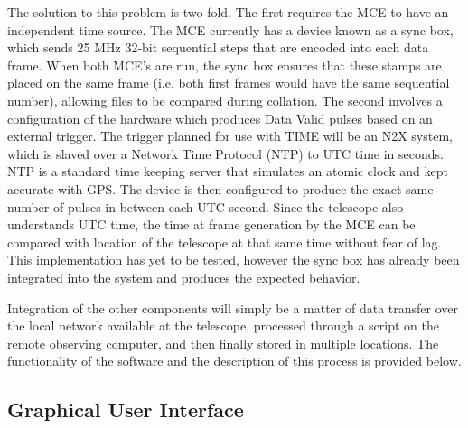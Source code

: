 \documentclass[manuscript]{aastex}
\begin{document}
The solution to this problem is two-fold. The first requires the MCE to have an independent time source. The MCE currently has a device known as a sync box, which sends 25 MHz 32-bit sequential steps that are encoded into each data frame. When both MCE's are run, the sync box ensures that these stamps are placed on the same frame (i.e. both first frames would have the same sequential number), allowing files to be compared during collation. The second involves a configuration of the hardware which produces Data Valid pulses based on an external trigger. The trigger planned for use with TIME will be an N2X system, which is slaved over a Network Time Protocol (NTP) to UTC time in seconds. NTP is a standard time keeping server that simulates an atomic clock and kept accurate with GPS. The device is then configured to produce the exact same number of pulses in between each UTC second. Since the telescope also understands UTC time, the time at frame generation by the MCE can be compared with location of the telescope at that same time without fear of lag. This implementation has yet to be tested, however the sync box has already been integrated into the system and produces the expected behavior. 

Integration of the other components will simply be a matter of data transfer over the local network available at the telescope, processed through a script on the remote observing computer, and then finally stored in multiple locations. The functionality of the software and the description of this process is provided below. 


\subsection{Graphical User Interface}
\end{document}
